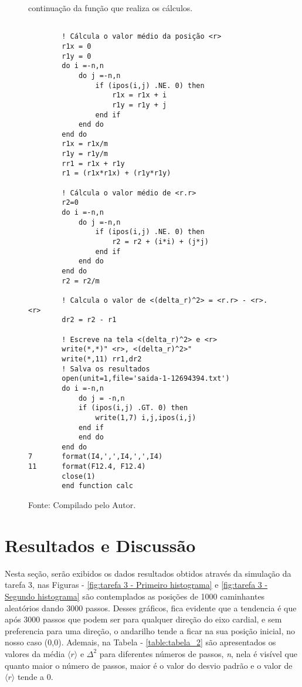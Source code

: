 \begin{figure}[H]
\centering
\caption{continuação da função que realiza os cálculos.}
\centering
\begin{lstlisting}

        ! Cálcula o valor médio da posição <r>
        r1x = 0
        r1y = 0
        do i =-n,n
            do j =-n,n
                if (ipos(i,j) .NE. 0) then
                    r1x = r1x + i
                    r1y = r1y + j
                end if
            end do
        end do
        r1x = r1x/m
        r1y = r1y/m
        rr1 = r1x + r1y
        r1 = (r1x*r1x) + (r1y*r1y)

        ! Cálcula o valor médio de <r.r>
        r2=0
        do i =-n,n
            do j =-n,n
                if (ipos(i,j) .NE. 0) then
                    r2 = r2 + (i*i) + (j*j)
                end if
            end do
        end do
        r2 = r2/m

        ! Calcula o valor de <(delta_r)^2> = <r.r> - <r>.<r>
        dr2 = r2 - r1

        ! Escreve na tela <(delta_r)^2> e <r>
        write(*,*)" <r>, <(delta_r)^2>"
        write(*,11) rr1,dr2
        ! Salva os resultados
        open(unit=1,file='saida-1-12694394.txt')
        do i =-n,n
            do j = -n,n
            if (ipos(i,j) .GT. 0) then
                write(1,7) i,j,ipos(i,j)
            end if
            end do
        end do
7       format(I4,',',I4,',',I4)
11      format(F12.4, F12.4)
        close(1)
        end function calc
\end{lstlisting}
\caption*{Fonte: Compilado pelo Autor.}
\label{fig:tarefa 3 - função principal do código}
\end{figure}


\newpage
\section*{Resultados e Discussão}

Nesta seção, serão exibidos os dados resultados obtidos através da simulação da tarefa 3,
nas Figuras - \ref{fig:tarefa 3 - Primeiro histograma} e \ref{fig:tarefa 3 - Segundo histograma}
são contemplados as posições de 1000 caminhantes aleatórios dando 3000 passos. Desses gráficos,
fica evidente que a tendencia é que após 3000 passos que podem ser para qualquer direção do eixo cardial,
e sem preferencia para uma direção, o andarilho tende a ficar na sua posição inicial, no nosso caso (0,0).
Ademais, na Tabela - \ref{table:tabela_2} são apresentados os valores da média $\langle r \rangle$ e $ \Delta^2 $
para diferentes números de passos, \textit{n}, nela é visível que quanto maior o número de passos, maior é o valor do desvio padrão e 
o valor de $\langle r \rangle$ tende a 0. 

